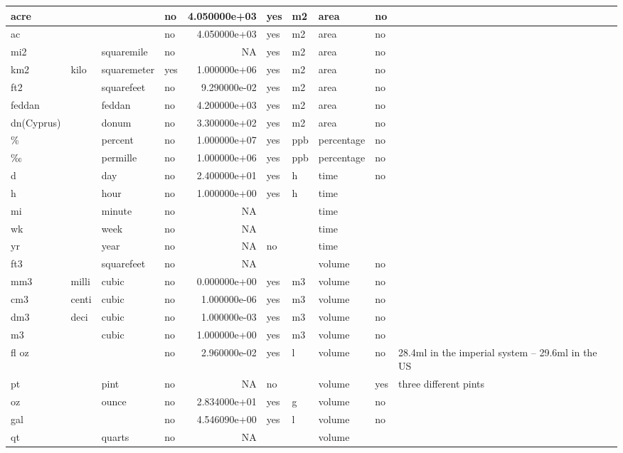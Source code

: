 \begin{tabular}{l|l|l|l|r|l|l|l|l|l}
\hline
acre &  &  & no & 4.050000e+03 & yes & m2 & area & no & \\
\hline
ac &  &  & no & 4.050000e+03 & yes & m2 & area & no & \\
\hline
mi2 &  & squaremile & no & NA & yes & m2 & area & no & \\
\hline
km2 & kilo & squaremeter & yes & 1.000000e+06 & yes & m2 & area & no & \\
\hline
ft2 &  & squarefeet & no & 9.290000e-02 & yes & m2 & area & no & \\
\hline
feddan &  & feddan & no & 4.200000e+03 & yes & m2 & area & no & \\
\hline
dn(Cyprus) &  & donum & no & 3.300000e+02 & yes & m2 & area & no & \\
\hline
\% &  & percent & no & 1.000000e+07 & yes & ppb & percentage & no & \\
\hline
‰ &  & permille & no & 1.000000e+06 & yes & ppb & percentage & no & \\
\hline
d &  & day & no & 2.400000e+01 & yes & h & time & no & \\
\hline
h &  & hour & no & 1.000000e+00 & yes & h & time &  & \\
\hline
mi &  & minute & no & NA &  &  & time &  & \\
\hline
wk &  & week & no & NA &  &  & time &  & \\
\hline
yr &  & year & no & NA & no &  & time &  & \\
\hline
ft3 &  & squarefeet & no & NA &  &  & volume & no & \\
\hline
mm3 & milli & cubic & no & 0.000000e+00 & yes & m3 & volume & no & \\
\hline
cm3 & centi & cubic & no & 1.000000e-06 & yes & m3 & volume & no & \\
\hline
dm3 & deci & cubic & no & 1.000000e-03 & yes & m3 & volume & no & \\
\hline
m3 &  & cubic & no & 1.000000e+00 & yes & m3 & volume & no & \\
\hline
fl oz &  &  & no & 2.960000e-02 & yes & l & volume & no & 28.4ml in the imperial system – 29.6ml in the US\\
\hline
pt &  & pint & no & NA & no &  & volume & yes & three different pints\\
\hline
oz &  & ounce & no & 2.834000e+01 & yes & g & volume & no & \\
\hline
gal &  &  & no & 4.546090e+00 & yes & l & volume & no & \\
\hline
qt &  & quarts & no & NA &  &  & volume &  & \\

\end{tabular}
